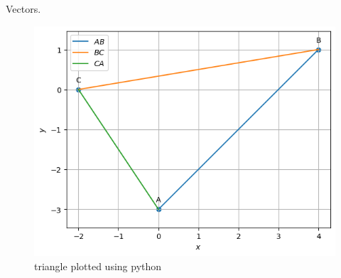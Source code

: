 \begin{table}[H]
        \centering
        
        \caption{Vectors.}
        \label{tab:Vectors}
    \end{table}
\begin{figure}[H]
\includegraphics[width=\columnwidth]{vectors/figs/Triangle.png}
\caption{triangle plotted using python}
\label{fig:i_triangle_py}
\end{figure}

